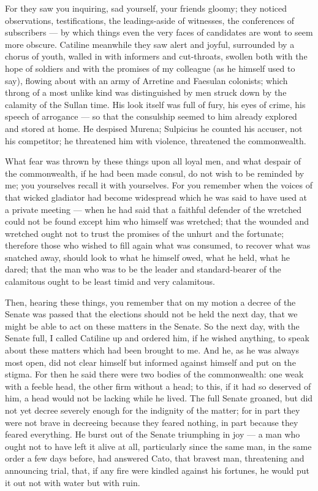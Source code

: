  For they saw you inquiring, sad yourself, your friends gloomy; they noticed observations, testifications, the leadings-aside of witnesses, the conferences of subscribers --- by which things even the very faces of candidates are wont to seem more obscure. Catiline meanwhile they saw alert and joyful, surrounded by a chorus of youth, walled in with informers and cut-throats, swollen both with the hope of soldiers and with the promises of my colleague (as he himself used to say), flowing about with an army of Arretine and Faesulan colonists; which throng of a most unlike kind was distinguished by men struck down by the calamity of the Sullan time. His look itself was full of fury, his eyes of crime, his speech of arrogance --- so that the consulship seemed to him already explored and stored at home. He despised Murena; Sulpicius he counted his accuser, not his competitor; he threatened him with violence, threatened the commonwealth.

 What fear was thrown by these things upon all loyal men, and what despair of the commonwealth, if he had been made consul, do not wish to be reminded by me; you yourselves recall it with yourselves. For you remember when the voices of that wicked gladiator had become widespread which he was said to have used at a private meeting --- when he had said that a faithful defender of the wretched could not be found except him who himself was wretched; that the wounded and wretched ought not to trust the promises of the unhurt and the fortunate; therefore those who wished to fill again what was consumed, to recover what was snatched away, should look to what he himself owed, what he held, what he dared; that the man who was to be the leader and standard-bearer of the calamitous ought to be least timid and very calamitous.

 Then, hearing these things, you remember that on my motion a decree of the Senate was passed that the elections should not be held the next day, that we might be able to act on these matters in the Senate. So the next day, with the Senate full, I called Catiline up and ordered him, if he wished anything, to speak about these matters which had been brought to me. And he, as he was always most open, did not clear himself but informed against himself and put on the stigma. For then he said there were two bodies of the commonwealth: one weak with a feeble head, the other firm without a head; to this, if it had so deserved of him, a head would not be lacking while he lived. The full Senate groaned, but did not yet decree severely enough for the indignity of the matter; for in part they were not brave in decreeing because they feared nothing, in part because they feared everything. He burst out of the Senate triumphing in joy --- a man who ought not to have left it alive at all, particularly since the same man, in the same order a few days before, had answered Cato, that bravest man, threatening and announcing trial, that, if any fire were kindled against his fortunes, he would put it out not with water but with ruin.

